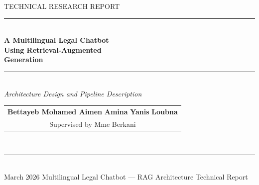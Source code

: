 \documentclass[12pt, a4paper]{article}
\begin{document}
\begin{titlepage}
  \pagecolor{primary}
  \color{white}\centering
  \vspace*{2.5cm}
  {\fontsize{11}{13}\selectfont\color{lightblue}\MakeUppercase{Technical Research Report}}\\[0.4cm]
  \color{white}\rule{0.5\linewidth}{0.6pt}\\[1.2cm]
  {\fontsize{22}{27}\selectfont\bfseries
    A Multilingual Legal Chatbot\\[0.25em]
    Using Retrieval-Augmented\\[0.25em]
    Generation}\\[1.0cm]
  \color{lightblue}\rule{0.4\linewidth}{0.4pt}\\[0.8cm]
  {\normalsize\itshape Architecture Design and Pipeline Description}\\[2.5cm]
  {\small
    \begin{tabular}{c}
      \textbf{Bettayeb Mohamed Aimen} \quad \textbf{Amina} \quad \textbf{Yanis} \quad \textbf{Loubna}\\[0.4em]
      \color{lightblue}Supervised by Mme Berkani
    \end{tabular}
  }\\[1.8cm]
  \color{lightblue}\rule{0.3\linewidth}{0.3pt}\\[0.5cm]
  {\small March 2026}
  \vfill
  {\footnotesize\color{medgray} Multilingual Legal Chatbot --- RAG Architecture Technical Report}
\end{titlepage}
\pagecolor{white}\color{darkgray}

\newpage
\thispagestyle{empty}
\vspace*{1cm}
\end{document}
